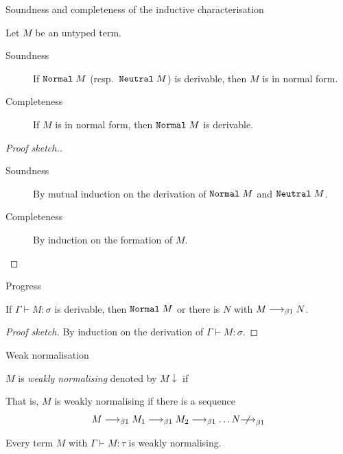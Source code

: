 \begin{frame}{Soundness and completeness of the inductive characterisation}
  \begin{lemma}
    Let $M$ be an untyped term.
    \begin{description}
      \item[Soundness] If $\normal\;M$ (resp.\ $\neutral\;M$) is derivable, then $M$ is in normal form.
      \item[Completeness]
        If $M$ is in normal form, then $\normal\;M$ is derivable.
    \end{description}
  \end{lemma}
  \begin{proof}[Proof sketch.]
    \begin{description}
      \item[Soundness] By mutual induction on the derivation of
    $\normal\;M$ and $\neutral\;M$.
      \item[Completeness] By induction on the formation of $M$.
    \end{description}
  \end{proof}

  
\end{frame}
\begin{frame}{Progress}
  \begin{theorem}
    If $\Gamma \vdash M : \sigma$ is derivable, then $\normal\;M$ or there is $N$ with $M \onereduce N$.
  \end{theorem}
  \begin{proof}[Proof sketch]
    By induction on the derivation of $\Gamma \vdash M : \sigma$. 
  \end{proof}
\end{frame}


\begin{frame}{Weak normalisation}
  \begin{definition}
    $M$ is \emph{weakly normalising} denoted by $M\downarrow$ if 
    \begin{multicols}{2}
      \begin{prooftree}
      \end{prooftree}
      \columnbreak
      \begin{prooftree}
      \end{prooftree}
    \end{multicols}
  \end{definition}
  That is, $M$ is weakly normalising if there is a sequence
  \[
    M \onereduce M_1 \onereduce M_2 \onereduce \dots N \notonereduce 
  \]
  \begin{theorem}
    Every term $M$ with $\Gamma \vdash M : \tau$ is weakly normalising.
  \end{theorem}

\end{frame}


